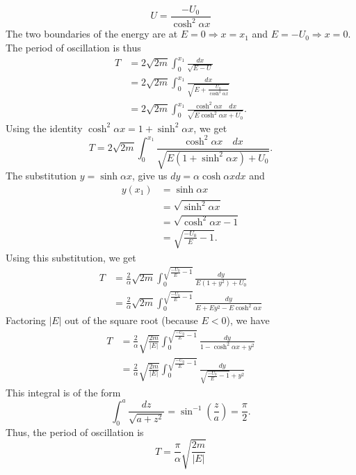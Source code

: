 \begin{subproblem}
{
\begin{equation*}
    U = \frac{-U_0}{\cosh^2{\alpha x}}
\end{equation*}
}
{
The two boundaries of the energy are at $E=0 \Rightarrow x=x_1$ and $E=-U_0 \Rightarrow x=0$. The period of oscillation is thus
\begin{align*}
    T &= 2\sqrt{2m} \int_0^{x_1}\frac{dx}{\sqrt{E-U}} \\
    &= 2\sqrt{2m} \int_0^{x_1}\frac{dx}{\sqrt{E+\frac{U_0}{\cosh^2{\alpha x}}}} \\
    &= 2\sqrt{2m} \int_0^{x_1}\frac{\cosh^2{\alpha x} \quad dx}{\sqrt{E\cosh^2{\alpha x}+U_0}}.
\end{align*}
Using the identity $\cosh^2{\alpha x} = 1 + \sinh^2{\alpha x}$, we get
\begin{equation*}
    T = 2\sqrt{2m} \int_0^{x_1}\frac{\cosh^2{\alpha x} \quad dx}{\sqrt{E\left(1+\sinh^2{\alpha x}\right)+U_0}}.
\end{equation*}
The substitution $y=\sinh{\alpha x}$, give us $dy = \alpha\cosh{\alpha x}dx$ and
\begin{align*}
    y(x_1) &= \sinh{\alpha x} \\
    &= \sqrt{\sinh^2{\alpha x}} \\
    &= \sqrt{ \cosh^2{\alpha x} - 1 }\\
    &= \sqrt{\frac{-U_0}{E} - 1}.
\end{align*}
Using this substitution, we get
\begin{align*}
    T &= \frac{2}{\alpha}\sqrt{2m} \int_0^{\sqrt{\frac{-U_0}{E} - 1}} \frac{dy}{E\left( 1 + y^2 \right) + U_0} \\
    &= \frac{2}{\alpha}\sqrt{2m} \int_0^{\sqrt{\frac{-U_0}{E} - 1}} \frac{dy}{E+ Ey^2 - E\cosh^2{\alpha x}}
\end{align*}
Factoring $|E|$ out of the square root (because $E<0$), we have
\begin{align*}
    T &= \frac{2}{\alpha}\sqrt{\frac{2m}{|E|}} \int_0^{\sqrt{\frac{-U_0}{E} - 1}} \frac{dy}{1-\cosh^2{\alpha x} + y^2} \\
    &= \frac{2}{\alpha}\sqrt{\frac{2m}{|E|}} \int_0^{\sqrt{\frac{-U_0}{E} - 1}} \frac{dy}{\sqrt{\frac{-U_0}{E} - 1} + y^2}
\end{align*}
This integral is of the form
\begin{equation*}
    \int_0^a \frac{dz}{\sqrt{a + z^2}} = \sin^{-1}{\left(\frac{z}{a}\right)} = \frac{\pi}{2}.
\end{equation*}
Thus, the period of oscillation is
}
{
\begin{equation*}
    T = \frac{\pi}{\alpha}\sqrt{\frac{2m}{|E|}}
\end{equation*}
}
\end{subproblem}

